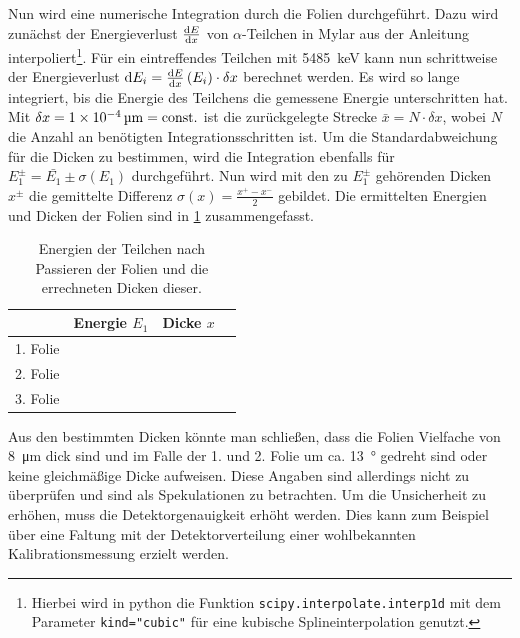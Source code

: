 Nun wird eine numerische Integration durch die Folien durchgeführt.
Dazu wird zunächst der Energieverlust $\dv{E}{x}$ von $\alpha$-Teilchen in Mylar aus der Anleitung interpoliert\footnote{Hierbei wird in python die Funktion \texttt{scipy.interpolate.interp1d} mit dem Parameter \texttt{kind="cubic"} für eine kubische Splineinterpolation genutzt.}.
Für ein eintreffendes Teilchen mit \SI{5485}{\kilo\electronvolt} kann nun schrittweise der Energieverlust $\dd E_i = \dv{E}{x} \left(E_i\right) \cdot \delta x$ berechnet werden.
Es wird so lange integriert, bis die Energie des Teilchens die gemessene Energie unterschritten hat.
Mit $\delta x = \SI{1e-4}{\micro\meter} = \text{const.}$ ist die zurückgelegte Strecke $\bar{x} = N \cdot \delta x$, wobei $N$ die Anzahl an benötigten Integrationsschritten ist.
Um die Standardabweichung für die Dicken zu bestimmen, wird die Integration ebenfalls für $E_1^\pm = \bar{E_1} \pm \sigma(E_1)$ durchgeführt.
Nun wird mit den zu $E_1^\pm$ gehörenden Dicken $x^\pm$ die gemittelte Differenz $\sigma(x) = \frac{x^+ - x^-}{2}$ gebildet.
Die ermittelten Energien und Dicken der Folien sind in \cref{tab:dicken} zusammengefasst.

\begin{table}[ht]
	\centering
	\caption{Energien der Teilchen nach Passieren der Folien und die errechneten Dicken dieser.} 
	\label{tab:dicken}
	\begin{tabular}{c|ccc}
		\toprule
		         &          Energie $E_1$          &           Dicke $x$           &  \\ \midrule
		1. Folie &  &  &  \\
		2. Folie &  &  &  \\
		3. Folie &  &  &  \\ \bottomrule
	\end{tabular}
\end{table}

Aus den bestimmten Dicken könnte man schließen, dass die Folien Vielfache von \SI{8}{\micro\meter} dick sind und im Falle der 1. und 2. Folie um ca. \SI{13}{\degree} gedreht sind oder keine gleichmäßige Dicke aufweisen.
Diese Angaben sind allerdings nicht zu überprüfen und sind als Spekulationen zu betrachten.
Um die Unsicherheit zu erhöhen, muss die Detektorgenauigkeit erhöht werden.
Dies kann zum Beispiel über eine Faltung mit der Detektorverteilung einer wohlbekannten Kalibrationsmessung erzielt werden.

